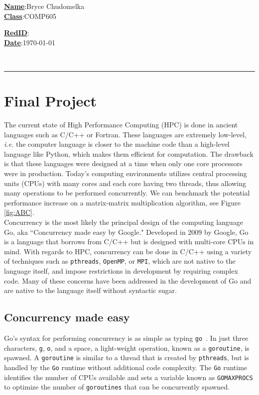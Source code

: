 \documentclass[12pt]{article}
\begin{document}
	\hspace*{-0.6cm}
	\begin{minipage}{0.5\linewidth}
		\underline{\textbf{Name}}:\quad Bryce Chudomelka\\
		\underline{\textbf{Class}}:\quad COMP605
	\end{minipage}
	\hfill
	\begin{minipage}{0.24\linewidth}
		\underline{\textbf{RedID}}:\\
		\underline{\textbf{Date}}:\quad \today
	\end{minipage}\\
	\noindent\rule{\textwidth}{0.25pt}
	\section*{Final Project}
		The current state of High Performance Computing (HPC) is done in ancient languages such as C/C++ or Fortran. These languages are extremely low-level, \textit{i.e.} the computer language is closer to the machine code than a high-level language like Python, which makes them efficient for computation. The drawback is that these languages were designed at a time when only one core processors were in production. Today's computing environments utilizes central processing units (CPUs) with many cores and each core having two threads, thus allowing many operations to be performed concurrently. We can benchmark the potential performance increase on a matrix-matrix multiplication algorithm, see Figure \ref{fig:ABC}.\\
		
		Concurrency is the most likely the principal design of the computing language Go, aka ``Concurrency made easy by Google." Developed in 2009 by Google, Go is a language that borrows from C/C++ but is designed with multi-core CPUs in mind. With regards to HPC, concurrency can be done in C/C++ using a variety of techniques such as \texttt{pthreads}, \texttt{OpenMP}, or \texttt{MPI}, which are not native to the language itself, and impose restrictions in development by requiring complex code. Many of these concerns have been addressed in the development of Go and are native to the language itself without syntactic sugar.
		
	
		\subsection*{Concurrency made easy}
			Go's syntax for performing concurrency is as simple as typing \texttt{go }. In just three characters, \texttt{g}, \texttt{o}, and a space, a light-weight operation, known as a \texttt{goroutine}, is spawned. A \texttt{goroutine} is similar to a thread that is created by \texttt{pthreads}, but is handled by the \texttt{Go} runtime without additional code complexity. The \texttt{Go} runtime identifies the number of CPUs available and sets a variable known as \texttt{GOMAXPROCS} to optimize the number of \texttt{goroutines} that can be concurrently spawned.\\
			
\end{document}
